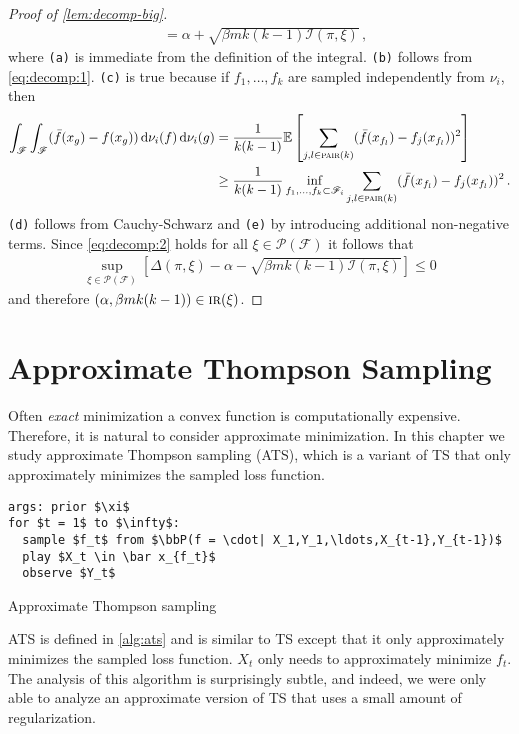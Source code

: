 \documentclass[letter, 12pt]{report}
\newcommand{\pair}{\operatorname{\textsc{pair}}}
\newcommand{\E}{\mathbb E}
\newcommand{\sF}{\mathscr F}
\newcommand{\sP}{\mathscr P}
\newcommand{\bbP}{\mathbb P}
\renewcommand{\d}[1]{\operatorname{d}\!#1}
\newcommand{\I}{\mathcal{I}}
\newcommand{\1}{\mathbf{1}}
\newcommand{\IR}{\operatorname{\textsc{ir}}}
\newcommand{\ts}{\textsc{TS}\xspace}
\newcommand{\ats}{\textsc{ATS}}
\theoremstyle{plain}
\theoremstyle{definition}
\theoremstyle{remark}
\begin{document}
\begin{proof}[Proof of \cref{lem:decomp-big}]
\begin{align}
         & = \alpha + \sqrt{\beta m k(k-1) \I(\pi, \xi)} \,, \label{eq:decomp:2}
    \end{align}
    where \texttt{(a)} is immediate from the definition of the integral.
    \texttt{(b)} follows from \cref{eq:decomp:1}.
    \texttt{(c)} is true because if $f_1,\ldots,f_k$ are sampled independently from $\nu_i$, then
    \begin{align*}
        \int_\sF \int_\sF (\bar f(x_g) - f(x_g)) \d{\nu_i}(f) \d{\nu_i}(g)
         & = \frac{1}{k(k-1)} \E\left[\sum_{j,l \in \pair(k)} (\bar f(x_{f_l}) - f_j(x_{f_l}))^2 \right]                            \\
         & \geq \frac{1}{k(k-1)} \inf_{f_1,\ldots,f_k \subset \sF_i} \sum_{j,l \in \pair(k)} (\bar f(x_{f_l}) - f_j(x_{f_l}))^2 \,.
    \end{align*}
    \texttt{(d)} follows from Cauchy-Schwarz and \texttt{(e)} by introducing additional non-negative terms.
    Since \cref{eq:decomp:2} holds for all $\xi \in \sP(\sF)$ it follows that
    \begin{align*}
        \sup_{\xi \in \sP(\sF)} \left[\Delta(\pi, \xi) - \alpha - \sqrt{\beta mk(k-1) \I(\pi, \xi)}\right] \leq 0
    \end{align*}
    and therefore $(\alpha, \beta mk(k-1)) \in \IR(\xi)$.
\end{proof}

\chapter{Approximate Thompson Sampling}\label{ch:ats}
Often \textit{exact} minimization a convex function is computationally expensive.
Therefore, it is natural to consider approximate minimization.
In this chapter we study approximate Thompson sampling (\ats), which is a variant of \ts that
only approximately minimizes the sampled loss function.

\begin{algorithm}[h!]
    \begin{minipage}{12cm}
        \begin{mdframed}
            \begin{lstlisting}
args: prior $\xi$
for $t = 1$ to $\infty$:
  sample $f_t$ from $\bbP(f = \cdot| X_1,Y_1,\ldots,X_{t-1},Y_{t-1})$
  play $X_t \in \bar x_{f_t}$
  observe $Y_t$
\end{lstlisting}
            \caption{Approximate Thompson sampling}\label{alg:ats}
        \end{mdframed}
    \end{minipage}
\end{algorithm}
\ats{} is defined in \cref{alg:ats} and is similar to \ts except that it only approximately minimizes the sampled loss function.
$X_t$ only needs to approximately minimize $f_t$.
The analysis of this algorithm is surprisingly subtle,
and indeed, we were only able to analyze an approximate version of \ts that uses a small amount of regularization.
\end{document}
